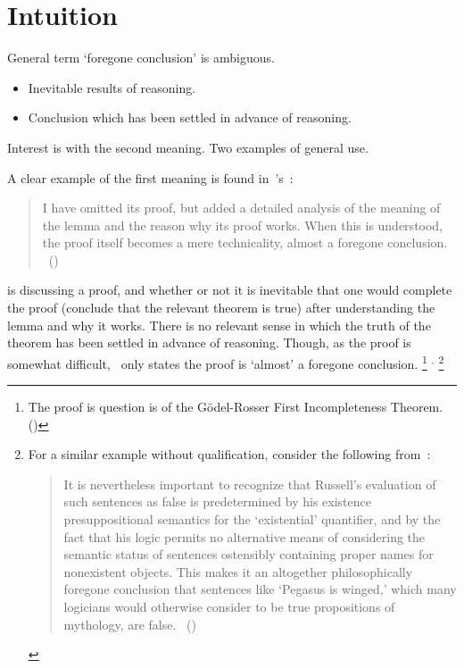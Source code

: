 \section{Intuition}
\label{sec:intuition}

\begin{note}
  General term `foregone conclusion' is ambiguous.
  \begin{itemize}
    \item
    Inevitable results of reasoning.
  \item
    Conclusion which has been settled in advance of reasoning.
  \end{itemize}

  Interest is with the second meaning.
  Two examples of general use.

  A clear example of the first meaning is found in~\citeauthor{Machover:1996vu}'s~:

  \begin{quote}
    I have omitted its proof, but added a detailed analysis of the meaning of the lemma and the reason why its proof works. When this is understood, the proof itself becomes a mere technicality, almost a foregone conclusion.%
    \mbox{ }\hfill\mbox{(\citeyear[viii]{Machover:1996vu})}
  \end{quote}

  \citeauthor{Machover:1996vu} is discussing a proof, and whether or not it is inevitable that one would complete the proof (conclude that the relevant theorem is true) after understanding the lemma and why it works.
  There is no relevant sense in which the truth of the theorem has been settled in advance of reasoning.
  Though, as the proof is somewhat difficult,~\citeauthor{Machover:1996vu} only states the proof is `almost' a foregone conclusion.%
  \footnote{
    The proof is question is of the G\"{o}del-Rosser First Incompleteness Theorem.
    (\citeyear[Cf.][226]{Machover:1996vu})
  }%
  \(^{,}\)
  \footnote{
    For a similar example without qualification, consider the following from~\textcite{Jacquette:2002up}:
    \begin{quote}
    It is nevertheless important to recognize that Russell's evaluation of such sentences as false is predetermined by his existence presuppositional semantics for the ‘existential' quantifier, and by the fact that his logic permits no alternative means of considering the semantic status of sentences ostensibly containing proper names for nonexistent objects.
    This makes it an altogether philosophically foregone conclusion that sentences like ‘Pegasus is winged,' which many logicians would otherwise consider to be true propositions of mythology, are false.%
    \mbox{ }\hfill\mbox{(\citeyear[6]{Jacquette:2002up})}
  \end{quote}
  }


\end{note}
